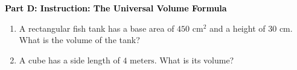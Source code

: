 \documentclass[12pt, letterpaper, fleqn]{article}
\begin{document}
\newpage

\begin{tcolorbox}[colback=customteal!20]
\large\textcolor{black}{\textbf{Part D: Instruction: The Universal Volume Formula}}
\end{tcolorbox}

\vspace{3mm}

\begin{enumerate}[itemsep=2.2cm, leftmargin=0.6cm, resume]
\item A rectangular fish tank has a base area of $450\text{ cm}^2$ and a height of $30\text{ cm}$. What is the volume of the tank?
\item A cube has a side length of $4\text{ meters}$. What is its volume?
\end{enumerate}
\end{document}
